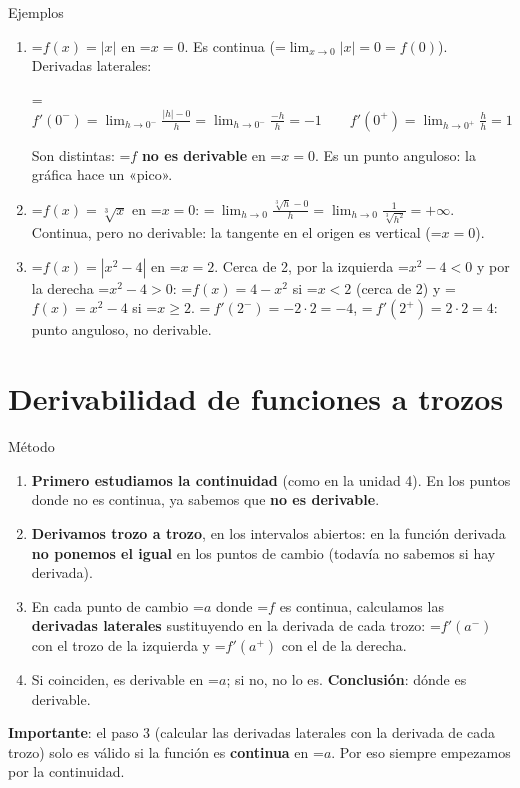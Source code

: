 \documentclass[11pt,a4paper]{article}
\newcommand{\lt}{<}\newcommand{\gt}{>}
\newcommand{\fmm}[1]{\setbox0=\hbox{$#1$}\ifdim\wd0>\linewidth\[#1\]\else\mbox{\box0}\fi}
\newcommand{\fmuline}[1]{\textbf{\color{fmaccent}#1}}
\begin{document}
  
\begin{fmex}{Ejemplos}
\begin{enumerate}[label=\textbf{\arabic*.},leftmargin=*]
\item \fmm{f(x)=|x|} en \fmm{x=0}. Es continua (\fmm{\lim_{x\to0}|x|=0=f(0)}). Derivadas laterales:
          

            

\fmm{f'(0^-)=\displaystyle\lim_{h\to0^-}\frac{|h|-0}{h}=\lim_{h\to0^-}\frac{-h}{h}=-1\qquad f'(0^+)=\lim_{h\to0^+}\frac{h}{h}=1}

            

Son distintas: \fmm{f} \textbf{no es derivable} en \fmm{x=0}. Es un punto anguloso: la gráfica hace un «pico».
\item \fmm{f(x)=\sqrt[3]{x}} en \fmm{x=0}: \fmm{\ \displaystyle\lim_{h\to0}\frac{\sqrt[3]{h}-0}{h}=\lim_{h\to0}\frac{1}{\sqrt[3]{h^2}}=+\infty}. Continua, pero no derivable: la tangente en el origen es vertical (\fmm{x=0}).
\item \fmm{f(x)=|x^2-4|} en \fmm{x=2}. Cerca de 2, por la izquierda \fmm{x^2-4\lt0} y por la derecha \fmm{x^2-4\gt0}: \fmm{f(x)=4-x^2} si \fmm{x\lt2} (cerca de 2) y \fmm{f(x)=x^2-4} si \fmm{x\geq2}. \fmm{\ f'(2^-)=-2\cdot2=-4}, \fmm{\ f'(2^+)=2\cdot2=4}: punto anguloso, no derivable.
\end{enumerate}
\end{fmex}

  
\section{Derivabilidad de funciones a trozos}\hypertarget{sec8}{}

  

  
\begin{fmdef}{Método}
\begin{enumerate}
\item \textbf{Primero estudiamos la continuidad} (como en la unidad 4). En los puntos donde no es continua, ya sabemos que \textbf{no es derivable}.
\item \textbf{Derivamos trozo a trozo}, en los intervalos abiertos: en la función derivada \textbf{no ponemos el igual} en los puntos de cambio (todavía no sabemos si hay derivada).
\item En cada punto de cambio \fmm{a} donde \fmm{f} es continua, calculamos las \textbf{derivadas laterales} sustituyendo en la derivada de cada trozo: \fmm{f'(a^-)} con el trozo de la izquierda y \fmm{f'(a^+)} con el de la derecha.
\item Si coinciden, es derivable en \fmm{a}; si no, no lo es. \textbf{Conclusión}: dónde es derivable.
\end{enumerate}

      
\begin{fmnote}\fmuline{Importante}: el paso 3 (calcular las derivadas laterales con la derivada de cada trozo) solo es válido si la función es \textbf{continua} en \fmm{a}. Por eso siempre empezamos por la continuidad.\end{fmnote}
\end{fmdef}
\end{document}
